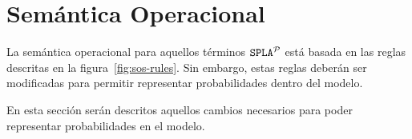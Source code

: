

\section{Semántica Operacional}



La semántica operacional para aquellos términos  $\mathtt{SPLA{^{\cal P}}}$ está
basada en las reglas descritas en la figura~\ref{fig:sos-rules}.
Sin embargo, estas reglas deberán  ser modificadas para permitir
representar probabilidades dentro del modelo.

En esta sección serán descritos aquellos cambios necesarios para poder
representar probabilidades en el modelo.


